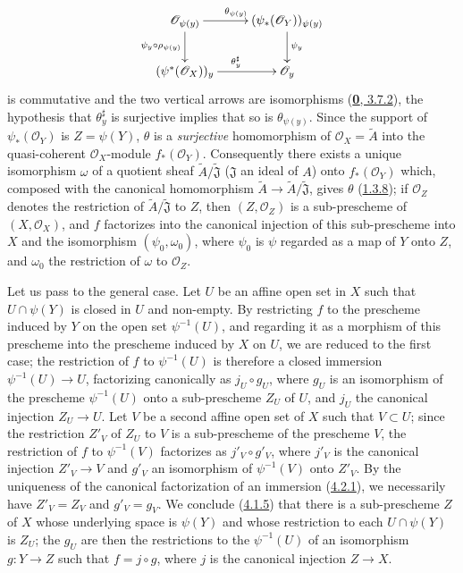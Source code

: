 \begin{enumerate}
  \[
    \xymatrix{
      \mathscr{O}_{\psi(y)}\ar[r]^{\theta_{\psi(y)}}
        \ar[d]_{\psi_y\circ\rho_{\psi(y)}} &
      (\psi_*(\mathscr{O}_Y))_{\psi(y)}\ar[d]^{\psi_y}\\
      (\psi^*(\mathscr{O}_X))_y\ar[r]^{\theta_y^\sharp} &
      \mathscr{O}_y
    }
  \]
  is commutative and the two vertical arrows are isomorphisms
  (\hyperref[0.3.7.2]{\textbf{0}, 3.7.2}), the hypothesis that $\theta_y^\sharp$ is
  surjective implies that so is $\theta_{\psi(y)}$. Since the
  support of $\psi_*(\mathscr{O}_Y)$ is $Z=\psi(Y)$, $\theta$ is a
  \emph{surjective} homomorphism of $\mathscr{O}_X=\widetilde{A}$ into the
  quasi-coherent $\mathscr{O}_X$-module $f_*(\mathscr{O}_Y)$. Consequently there
  exists a unique isomorphism $\omega$ of a quotient sheaf
  $\widetilde{A}/\widetilde{\mathfrak{J}}$ ($\mathfrak{J}$ an ideal of $A$) onto
  $f_*(\mathscr{O}_Y)$ which, composed with the canonical homomorphism
  $\widetilde{A}\to\widetilde{A}/\widetilde{\mathfrak{J}}$, gives $\theta$
  (\hyperref[I.1.3.8]{1.3.8}); if $\mathscr{O}_Z$ denotes the restriction
  of $\widetilde{A}/\widetilde{\mathfrak{J}}$ to $Z$, then
  $(Z,\mathscr{O}_Z)$ is a sub-prescheme of $(X,\mathscr{O}_X)$, and $f$
  factorizes into the canonical injection of this sub-prescheme into $X$ and
  the isomorphism $(\psi_0,\omega_0)$, where $\psi_0$ is $\psi$ regarded as a
  map of $Y$ onto $Z$, and $\omega_0$ the restriction of $\omega$ to
  $\mathscr{O}_Z$.

  Let us pass to the general case. Let $U$ be an affine open set in $X$ such
  that $U\cap\psi(Y)$ is closed in $U$ and non-empty. By restricting $f$ to the
  prescheme induced by $Y$ on the open set $\psi^{-1}(U)$, and regarding it
  as a morphism of this prescheme into the prescheme induced by $X$ on
  $U$, we are reduced to the first case; the restriction of $f$ to
  $\psi^{-1}(U)$ is therefore a closed immersion $\psi^{-1}(U)\to U$,
  factorizing canonically as $j_U\circ g_U$, where $g_U$ is an isomorphism
  of the prescheme $\psi^{-1}(U)$ onto a sub-prescheme $Z_U$ of $U$, and $j_U$
  the canonical injection $Z_U\to U$. Let $V$ be a second affine open set of
  $X$ such that $V\subset U$; since the restriction $Z'_V$ of $Z_U$ to $V$ is
  a sub-prescheme of the prescheme $V$, the restriction of $f$ to $\psi^{-1}(V)$
  factorizes as $j'_V\circ g'_V$, where $j'_V$ is the canonical injection
  $Z'_V\to V$ and $g'_V$ an isomorphism of $\psi^{-1}(V)$ onto $Z'_V$. By
  the uniqueness of the canonical factorization of an immersion
  (\hyperref[I.4.2.1]{4.2.1}), we necessarily have $Z'_V=Z_V$ and
  $g'_V=g_V$. We conclude (\hyperref[I.4.1.5]{4.1.5}) that there is a
  sub-prescheme $Z$ of $X$ whose underlying space is $\psi(Y)$ and whose
  restriction to each $U\cap\psi(Y)$ is $Z_U$; the $g_U$ are then the
  restrictions to the $\psi^{-1}(U)$ of an isomorphism $g:Y\to Z$ such that
  $f=j\circ g$, where $j$ is the canonical injection $Z\to X$.
\end{enumerate}

